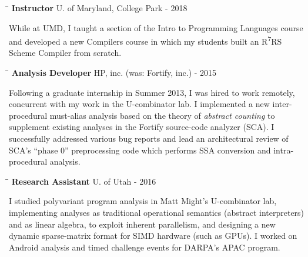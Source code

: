 \documentclass[line]{res}
\begin{document}
\begin{resume}
   \vspace{-0.2cm}  
   \begin{tabbing}
    \hspace{2.25in}\= \hspace{2.25in}\= \kill %
    {\bf Instructor} \>U. of Maryland, College Park   - 2018
   \end{tabbing}\vspace{-0.5cm}      %
   While at UMD, I taught a section of the Intro to Programming Languages course and developed a new Compilers course in which my students built an R\textsuperscript{7}RS Scheme Compiler from scratch. 
   \vspace{-0.2cm}
   \newpage
   \begin{tabbing}
    \hspace{2.25in}\= \hspace{2.25in}\= \kill %
    {\bf Analysis Developer} \>HP, inc. (was: Fortify, inc.)      - 2015
   \end{tabbing}\vspace{-0.5cm}      %
   Following a graduate internship in Summer 2013, I was hired to work remotely, concurrent with my work in the U-combinator lab.
   I implemented a new inter-procedural must-alias analysis based on the theory of \emph{abstract counting} to supplement existing analyses in the Fortify source-code analyzer (SCA).
   I successfully addressed various bug reports and lead an architectural review of SCA's ``phase 0'' preprocessing code which performs SSA conversion and intra-procedural analysis.
   \vspace{-0.2cm}  
   \begin{tabbing}
    \hspace{2.25in}\= \hspace{2.25in}\= \kill %
    {\bf Research Assistant} \>U. of Utah      - 2016
   \end{tabbing}\vspace{-0.5cm}      %
    I studied polyvariant program analysis in Matt Might's U-combinator lab, implementing analyses as
    traditional operational semantics (abstract interpreters) and as linear algebra, to exploit inherent parallelism, and designing a new dynamic sparse-matrix format for SIMD hardware (such as GPUs).
    I worked on Android analysis and timed challenge events for DARPA's APAC program. 

\end{resume}
\end{document}
